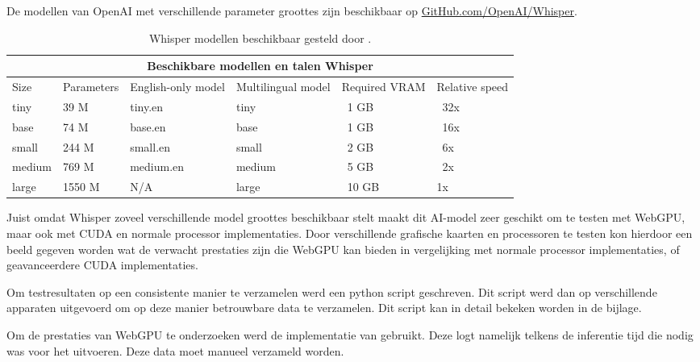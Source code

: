 \bigbreak{}

De modellen van OpenAI met verschillende parameter groottes zijn beschikbaar op \href{https://github.com/openai/whisper}{GitHub.com/OpenAI/Whisper}.

\bigbreak{}

\begin{table}
    \begin{tabular}{ |p{1.5cm}|p{2.5cm}|p{3cm}|p{3cm}|p{2cm}|p{2cm}|  }
        \hline
        \multicolumn{6}{|c|}{Beschikbare modellen en talen Whisper} \\
        \hline
            Size& Parameters & English-only model & Multilingual model & Required VRAM & Relative speed\\
        \hline
            tiny&       39 M    &tiny.en    & tiny& ~1 GB& ~32x     \\
            base &      74 M	&base.en    & base & ~1 GB & ~16x   \\
            small &     244 M	&small.en   & small & ~2 GB & ~6x   \\
            medium &    769 M	&medium.en  & medium & ~5 GB & ~2x  \\
            large &     1550 M	&N/A        & large & ~10 GB& 	1x  \\
        \hline
    \end{tabular}
    \caption{Whisper modellen beschikbaar gesteld door \textcite{OpenAI2023}.}
    \label{tab:OpenAIWhisperModels}
\end{table}

\bigbreak{}

Juist omdat Whisper zoveel verschillende model groottes beschikbaar stelt maakt dit AI-model zeer geschikt om te testen met WebGPU, maar ook met CUDA en normale processor implementaties. Door verschillende grafische kaarten en processoren te testen kon hierdoor een beeld gegeven worden wat de verwacht prestaties zijn die WebGPU kan bieden in vergelijking met normale processor implementaties, of geavanceerdere CUDA implementaties.

\bigbreak{}

Om testresultaten op een consistente manier te verzamelen werd een python script geschreven. Dit script werd dan op verschillende apparaten uitgevoerd om op deze manier betrouwbare data te verzamelen. Dit script kan in detail bekeken worden in de bijlage.

\bigbreak{}

Om de prestaties van WebGPU te onderzoeken werd de implementatie van \textcite{Fleetwood2024} gebruikt. Deze logt namelijk telkens de inferentie tijd die nodig was voor het uitvoeren. Deze data moet manueel verzameld worden.

